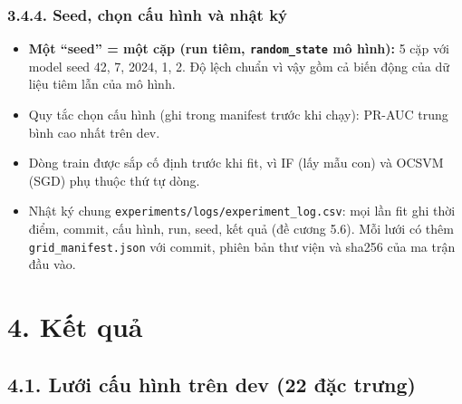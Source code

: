 \documentclass[
  11pt,
]{article}
\providecommand{\tightlist}{%
  \setlength{\itemsep}{0pt}\setlength{\parskip}{0pt}}
\begin{document}
\hypertarget{seed-chux1ecdn-cux1ea5u-huxecnh-vuxe0-nhux1eadt-kuxfd}{%
\subsubsection{3.4.4. Seed, chọn cấu hình và nhật
ký}\label{seed-chux1ecdn-cux1ea5u-huxecnh-vuxe0-nhux1eadt-kuxfd}}

\begin{itemize}
\tightlist
\item
  \textbf{Một ``seed'' = một cặp (run tiêm,
  \texttt{random\_\allowbreak{}state} mô hình):} 5 cặp với model seed
  42, 7, 2024, 1, 2. Độ lệch chuẩn vì vậy gồm cả biến động của dữ liệu
  tiêm lẫn của mô hình.
\item
  Quy tắc chọn cấu hình (ghi trong manifest trước khi chạy): PR-AUC
  trung bình cao nhất trên dev.
\item
  Dòng train được sắp cố định trước khi fit, vì IF (lấy mẫu con) và
  OCSVM (SGD) phụ thuộc thứ tự dòng.
\item
  Nhật ký chung
  \texttt{experiments/\allowbreak{}logs/\allowbreak{}experiment\_\allowbreak{}log.\allowbreak{}csv}:
  mọi lần fit ghi thời điểm, commit, cấu hình, run, seed, kết quả (đề
  cương 5.6). Mỗi lưới có thêm
  \texttt{grid\_\allowbreak{}manifest.\allowbreak{}json} với commit,
  phiên bản thư viện và sha256 của ma trận đầu vào.
\end{itemize}

\hypertarget{kux1ebft-quux1ea3}{%
\section{4. Kết quả}\label{kux1ebft-quux1ea3}}

\hypertarget{lux1b0ux1edbi-cux1ea5u-huxecnh-truxean-dev-22-ux111ux1eb7c-trux1b0ng}{%
\subsection{4.1. Lưới cấu hình trên dev (22 đặc
trưng)}\label{lux1b0ux1edbi-cux1ea5u-huxecnh-truxean-dev-22-ux111ux1eb7c-trux1b0ng}}
\end{document}
